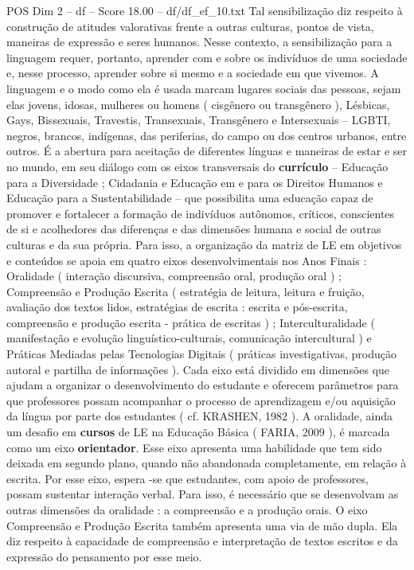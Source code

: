 \begin{textsample}{POS Dim 2 – df – Score 18.00 – df/df\_ef\_10.txt}
Tal sensibilização diz respeito à construção de atitudes valorativas frente a outras culturas, pontos de vista, maneiras de expressão e seres humanos.
Nesse contexto, a sensibilização para a linguagem requer, portanto, aprender com e sobre os indivíduos de uma sociedade e, nesse processo, aprender sobre si mesmo e a sociedade em que vivemos.
A linguagem e o modo como ela é usada marcam lugares sociais das pessoas, sejam elas jovens, idosas, mulheres ou homens ( cisgênero ou transgênero ), Lésbicas, Gays, Bissexuais, Travestis, Transexuais, Transgênero e Intersexuais – LGBTI, negros, brancos, indígenas, das periferias, do campo ou dos centros urbanos, entre outros.
É a abertura para aceitação de diferentes línguas e maneiras de estar e ser no mundo, em seu diálogo com os eixos transversais do \textbf{currículo} – Educação para a Diversidade ; Cidadania e Educação em e para os Direitos Humanos e Educação para a Sustentabilidade – que possibilita uma educação capaz de promover e fortalecer a formação de indivíduos autônomos, críticos, conscientes de si e acolhedores das diferenças e das dimensões humana e social de outras culturas e da sua própria.
Para isso, a organização da matriz de LE em objetivos e conteúdos se apoia em quatro eixos desenvolvimentais nos Anos Finais : Oralidade ( interação discursiva, compreensão oral, produção oral ) ; Compreensão e Produção Escrita ( estratégia de leitura, leitura e fruição, avaliação dos textos lidos, estratégias de escrita : escrita e pós-escrita, compreensão e produção escrita - prática de escritas ) ; Interculturalidade ( manifestação e evolução linguístico-culturais, comunicação intercultural ) e Práticas Mediadas pelas Tecnologias Digitais ( práticas investigativas, produção autoral e partilha de informações ).
Cada eixo está dividido em dimensões que ajudam a organizar o desenvolvimento do estudante e oferecem parâmetros para que professores possam acompanhar o processo de aprendizagem e/ou aquisição da língua por parte dos estudantes ( cf.
KRASHEN, 1982 ).
A oralidade, ainda um desafio em \textbf{cursos} de LE na Educação Básica ( FARIA, 2009 ), é marcada como um eixo \textbf{orientador}.
Esse eixo apresenta uma habilidade que tem sido deixada em segundo plano, quando não abandonada completamente, em relação à escrita.
Por esse eixo, espera -se que estudantes, com apoio de professores, possam sustentar interação verbal.
Para isso, é necessário que se desenvolvam as outras dimensões da oralidade : a compreensão e a produção orais.
O eixo Compreensão e Produção Escrita também apresenta uma via de mão dupla.
Ela diz respeito à capacidade de compreensão e interpretação de textos escritos e da expressão do pensamento por esse meio.

\end{textsample}
